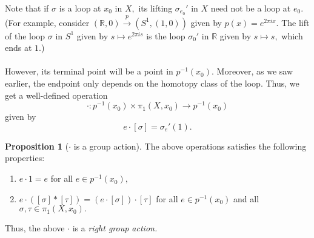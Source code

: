 \documentclass[12pt]{article}
\theoremstyle{definition}
\numberwithin{thm}{section}
\newtheorem{prop}[thm]{Proposition}
\begin{document}
Note that if $\sigma$ is a loop at $x_0$ in $X,$ its lifting $\sigma_{e_0}'$ in $X$ need not be a loop at $e_0.$ (For example, consider $(\mathbb{R}, 0) \overset{p}{\longrightarrow} (S^1, (1, 0))$ given by $p(x) = e^{2\pi ix}.$ The lift of the loop $\sigma$ in $S^1$ given by $s \mapsto e^{2\pi is}$ is the loop $\sigma_0'$ in $\mathbb{R}$ given by $s \mapsto s,$ which ends at $1.$)\\~\\
However, its terminal point will be a point in $p^{-1}(x_0).$ Moreover, as we saw earlier, the endpoint only depends on the homotopy class of the loop. Thus, we get a well-defined operation
\begin{equation*} 
	\cdot:p^{-1}(x_0) \times \pi_1(X, x_0) \to p^{-1}(x_0)
\end{equation*}
given by
\begin{equation*} 
	e\cdot[\sigma] = \sigma_e'(1).
\end{equation*}
\begin{prop}[$\cdot$ is a group action]
	The above operations satisfies the following properties:
	\begin{enumerate}
		\item $e\cdot 1 = e$ for all $e \in p^{-1}(x_0),$
		\item $e\cdot([\sigma]*[\tau]) = (e \cdot [\sigma])\cdot[\tau]$ for all $e \in p^{-1}(x_0)$ and all $\sigma, \tau \in \pi_1(X, x_0).$
	\end{enumerate}
\end{prop}
Thus, the above $\cdot$ is a \emph{right group action.}
\end{document}
